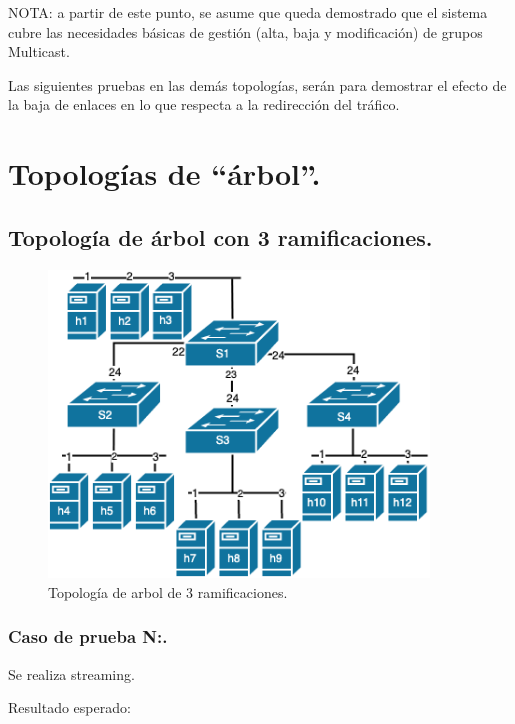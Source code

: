 \documentclass[12pt,a4paper,oneside]{book}
\begin{document}
\vspace{0.5cm}
NOTA: a partir de este punto, se asume que queda demostrado que el sistema cubre las necesidades básicas de gestión (alta, baja y modificación) de grupos Multicast.

\vspace{0.5cm}
Las siguientes pruebas en las demás topologías, serán para demostrar el efecto de la baja de enlaces en lo que respecta a la redirección del tráfico.


\section{Topologías de ``árbol''.}

\subsection{Topología de árbol con 3 ramificaciones.}

\begin{figure}[ht]
 \centering
 \includegraphics[width=0.9\textwidth]{fotos/5_Pruebas/2_topo_arbol/3ramas.png}
 \caption{Topología de arbol de 3 ramificaciones.}
 \label{topo_arbol_3_ramas}
\end{figure}

\subsubsection{Caso de prueba N:.} 
Se realiza streaming.

\vspace{0.5cm}
Resultado esperado: 
\end{document}
